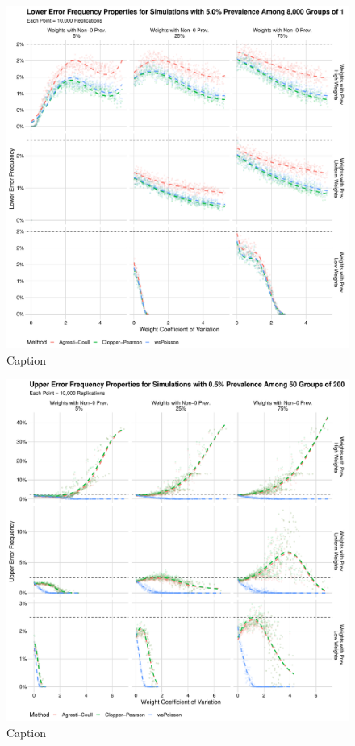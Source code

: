 \documentclass[AMA,STIX1COL]{WileyNJD-v2}
\begin{document}
\begin{figure}
\centering
\includegraphics[width=\textwidth]{figures/perfect_lower_error_frequency_8000_groups_0_05_prev.pdf}
\caption{Caption}
\label{fig:perfect_lower_error_frequency_8000_groups_0_05_prev}
\end{figure}

\begin{figure}
\centering
\includegraphics[width=\textwidth]{figures/perfect_upper_error_frequency_50_groups_0_005_prev.pdf}
\caption{Caption}
\label{fig:perfect_upper_error_frequency_50_groups_0_005_prev}
\end{figure}
\end{document}
